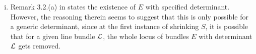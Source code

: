 \documentclass[letterpaper,12pt]{article}
\theoremstyle{remark}
\begin{document}
\begin{enumerate}[(i)]
    \item Remark 3.2.(a) in \cite{seshadri} states the existence of $E$ with specified determinant. However, the reasoning therein seems to suggest that this is only possible for a generic determinant, since at the first instance of shrinking $S$, it is possible that for a given line bundle $\mathcal{L}$, the whole locus of bundles $E$ with determinant $\mathcal{L}$ gets removed.
\end{enumerate}





\end{document}
